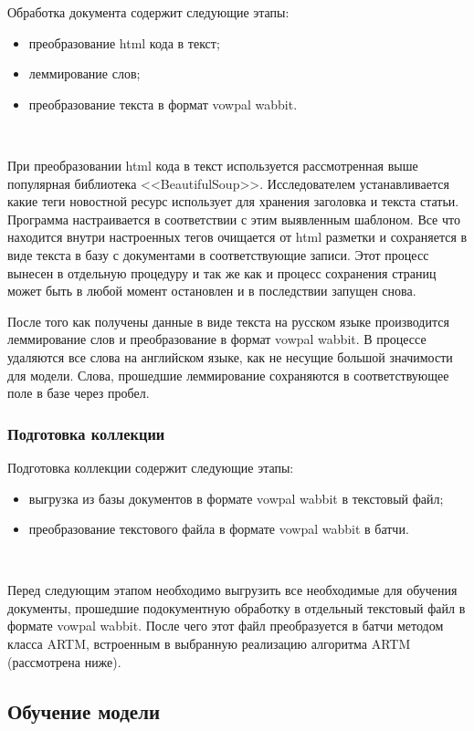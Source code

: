 Обработка документа содержит следующие этапы:

\begin{itemize}
    \item преобразование html кода в текст;
    \item леммирование слов;
    \item преобразование текста в формат vowpal wabbit.
\end{itemize}
~\

При преобразовании html кода в текст используется рассмотренная выше популярная библиотека <<BeautifulSoup>>. Исследователем устанавливается какие теги новостной ресурс использует для хранения заголовка и текста статьи. Программа настраивается в соответствии с этим выявленным шаблоном. Все что находится внутри настроенных тегов очищается от html разметки и сохраняется в виде текста в базу с документами в соответствующие записи. Этот процесс вынесен в отдельную процедуру и так же как и процесс сохранения страниц может быть в любой момент остановлен и в последствии запущен снова.

После того как получены данные в виде текста на русском языке производится леммирование слов и преобразование в формат vowpal wabbit. В процессе удаляются все слова на английском языке, как не несущие большой значимости для модели. Слова, прошедшие леммирование сохраняются в соответствующее поле в базе через пробел.

\subsubsection{Подготовка коллекции}

Подготовка коллекции содержит следующие этапы:

\begin{itemize}
    \item выгрузка из базы документов в формате vowpal wabbit в текстовый файл;
    \item преобразование текстового файла в формате vowpal wabbit в батчи.
\end{itemize}
~\

Перед следующим этапом необходимо выгрузить все необходимые для обучения документы, прошедшие подокументную обработку в отдельный текстовый файл в формате vowpal wabbit. После чего этот файл преобразуется в батчи методом класса ARTM, встроенным в выбранную реализацию алгоритма ARTM (рассмотрена ниже).

\subsection{Обучение модели}

